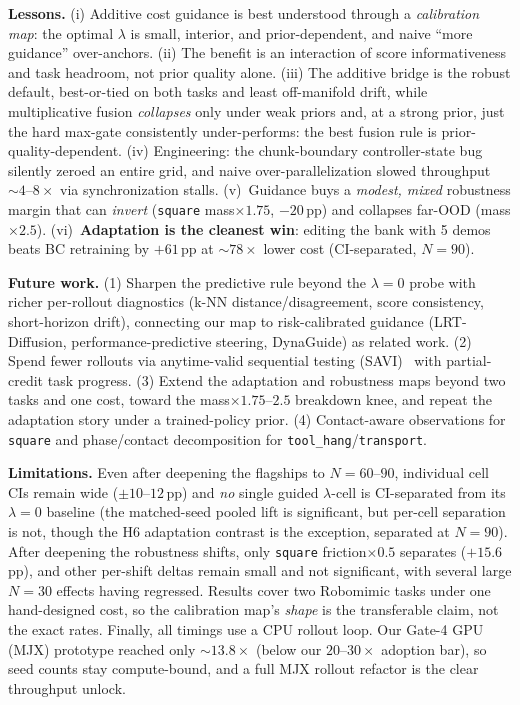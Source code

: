 \documentclass[letterpaper, 10 pt, conference]{ieeeconf}
\begin{document}
\textbf{Lessons.} (i) Additive cost guidance is best understood through a
\emph{calibration map}: the optimal $\lambda$ is small, interior, and
prior-dependent, and naive ``more guidance'' over-anchors. (ii) The benefit
is an interaction of score informativeness and task headroom, not prior
quality alone. (iii) The additive bridge is the robust default, best-or-tied
on both tasks and least off-manifold drift, while multiplicative fusion
\emph{collapses} only under weak priors and, at a strong prior, just the
hard max-gate consistently under-performs: the best fusion rule is
prior-quality-dependent. (iv) Engineering: the chunk-boundary
controller-state bug silently zeroed an entire grid, and naive
over-parallelization slowed throughput $\sim\!4$--$8\times$ via
synchronization stalls.
(v)~Guidance buys a \emph{modest, mixed} robustness margin that can
\emph{invert} (\texttt{square} mass$\times1.75$, $-20$\,pp) and collapses
far-OOD (mass$\times2.5$). (vi)~\textbf{Adaptation is the cleanest win}:
editing the bank with 5 demos beats BC retraining by $+61$\,pp at
$\sim\!78\times$ lower cost (CI-separated, $N\!=\!90$).

\textbf{Future work.} (1) Sharpen the predictive rule beyond the $\lambda\!=\!0$
probe with richer per-rollout diagnostics (k-NN distance/disagreement,
score consistency, short-horizon drift), connecting our map to
risk-calibrated guidance (LRT-Diffusion, performance-predictive steering,
DynaGuide) as related work. (2) Spend fewer rollouts via anytime-valid
sequential testing (SAVI)~\cite{savi} with partial-credit task progress. (3) Extend
the adaptation and robustness maps beyond two tasks and one cost, toward
the mass$\times1.75$--$2.5$ breakdown knee, and repeat the adaptation story
under a trained-policy prior. (4) Contact-aware observations for
\texttt{square} and phase/contact decomposition for
\texttt{tool\_hang}/\texttt{transport}.

\textbf{Limitations.} Even after deepening the flagships to
$N\!=\!60$--$90$, individual cell CIs remain wide ($\pm10$--$12$\,pp) and
\emph{no} single guided $\lambda$-cell is CI-separated from its $\lambda\!=\!0$
baseline (the matched-seed pooled lift is significant, but per-cell
separation is not, though the H6 adaptation contrast is the exception,
separated at $N\!=\!90$).
After deepening the robustness shifts, only \texttt{square}
friction$\times0.5$ separates ($+15.6$\,pp), and other per-shift deltas
remain small and not significant, with several large $N\!=\!30$ effects
having regressed.
Results cover two Robomimic tasks under one hand-designed cost, so the
calibration map's \emph{shape} is the transferable claim, not the exact
rates. Finally, all timings use a
CPU rollout loop. Our Gate-4 GPU (MJX) prototype reached only
$\sim\!13.8\times$ (below our $20$--$30\times$ adoption bar), so seed counts
stay compute-bound, and a full MJX rollout refactor is the clear throughput
unlock.
\end{document}
